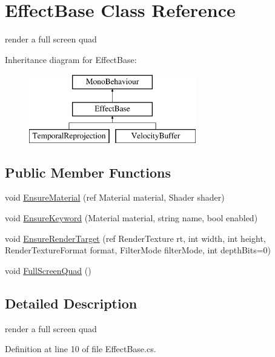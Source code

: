 \hypertarget{class_effect_base}{}\section{Effect\+Base Class Reference}
\label{class_effect_base}


render a full screen quad  


Inheritance diagram for Effect\+Base\+:\begin{figure}[H]
\begin{center}
\leavevmode
\includegraphics[height=3.000000cm]{class_effect_base}
\end{center}
\end{figure}
\subsection*{Public Member Functions}
\begin{DoxyCompactItemize}
\item 
void \mbox{\hyperlink{class_effect_base_abde71d0c91e2d28544af08b3773774fc}{Ensure\+Material}} (ref Material material, Shader shader)
\item 
void \mbox{\hyperlink{class_effect_base_a1a5287a30815dda368c87faadf842b98}{Ensure\+Keyword}} (Material material, string name, bool enabled)
\item 
void \mbox{\hyperlink{class_effect_base_aefffb1422e41a0b1c0889c9811b1157b}{Ensure\+Render\+Target}} (ref Render\+Texture rt, int width, int height, Render\+Texture\+Format format, Filter\+Mode filter\+Mode, int depth\+Bits=0)
\item 
void \mbox{\hyperlink{class_effect_base_a9a8d533c537feeaa9349f09665dc6cd8}{Full\+Screen\+Quad}} ()
\end{DoxyCompactItemize}


\subsection{Detailed Description}
render a full screen quad 



Definition at line 10 of file Effect\+Base.\+cs.



